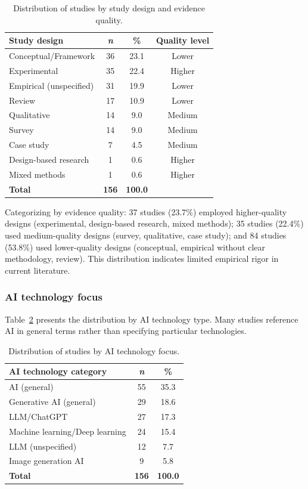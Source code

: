\documentclass[ed]{acnsart}
\begin{document}
\begin{table}[htbp]
\centering
\caption{Distribution of studies by study design and evidence quality.}
\label{tab:studydesign}
\small
\begin{tabular}{@{}lccc@{}}
\toprule
\hfill \textbf{Study design} & \textbf{\textit{n}} & \textbf{\%} & \textbf{Quality level} \\
\midrule
Conceptual/Framework & 36 & 23.1 & Lower \\
Experimental & 35 & 22.4 & Higher \\
Empirical (unspecified) & 31 & 19.9 & Lower \\
Review & 17 & 10.9 & Lower \\
Qualitative & 14 & 9.0 & Medium \\
Survey & 14 & 9.0 & Medium \\
Case study & 7 & 4.5 & Medium \\
Design-based research & 1 & 0.6 & Higher \\
Mixed methods & 1 & 0.6 & Higher \\
\midrule
\textbf{Total} & \textbf{156} & \textbf{100.0} & \\
\bottomrule
\end{tabular}
\end{table}

Categorizing by evidence quality: 37 studies (23.7\%) employed higher-quality designs (experimental, design-based research, mixed methods); 35 studies (22.4\%) used medium-quality designs (survey, qualitative, case study); and 84 studies (53.8\%) used lower-quality designs (conceptual, empirical without clear methodology, review). This distribution indicates limited empirical rigor in current literature.

\subsubsection{AI technology focus}

Table~\ref{tab:aitech} presents the distribution by AI technology type. Many studies reference AI in general terms rather than specifying particular technologies.

\begin{table}[htbp]
\centering
\caption{Distribution of studies by AI technology focus.}
\label{tab:aitech}
\small
\begin{tabular}{@{}lcc@{}}
\toprule
\hfill \textbf{AI technology category} & \textbf{\textit{n}} & \textbf{\%} \\
\midrule
AI (general) & 55 & 35.3 \\
Generative AI (general) & 29 & 18.6 \\
LLM/ChatGPT & 27 & 17.3 \\
Machine learning/Deep learning & 24 & 15.4 \\
LLM (unspecified) & 12 & 7.7 \\
Image generation AI & 9 & 5.8 \\
\midrule
\textbf{Total} & \textbf{156} & \textbf{100.0} \\
\bottomrule
\end{tabular}
\end{table}
\end{document}
